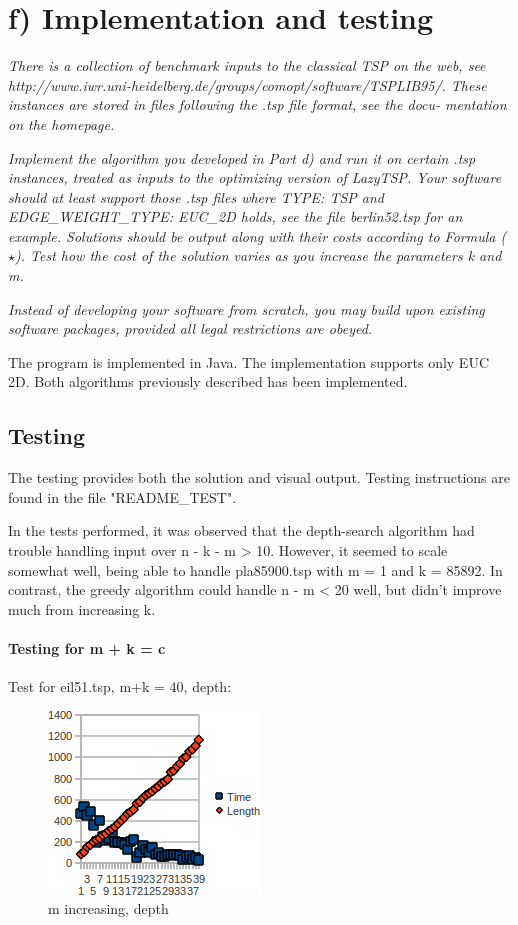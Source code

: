 
\section{f) Implementation and testing}

\textit{There is a collection of benchmark inputs to the classical TSP on the web, see
http://www.iwr.uni-heidelberg.de/groups/comopt/software/TSPLIB95/.
These instances are stored in files following the .tsp file format, see the docu-
mentation on the homepage.
}

\textit{Implement the algorithm you developed in Part d) and run it on certain .tsp
instances, treated as inputs to the optimizing version of LazyTSP. Your software
should at least support those .tsp files where TYPE: TSP and EDGE\_WEIGHT\_TYPE:
EUC\_2D holds, see the file berlin52.tsp for an example. Solutions should be
output along with their costs according to Formula (\(\star\)). Test how the cost of the
solution varies as you increase the parameters k and m.
}

\textit{Instead of developing your software from scratch, you may build upon existing
software packages, provided all legal restrictions are obeyed.
}

The program is implemented in Java. The implementation supports only EUC 2D.
Both algorithms previously described has been implemented.

\subsection{Testing}

The testing provides both the solution and visual output. Testing instructions
are found in the file "README\_TEST".

In the tests performed, it was observed that the depth-search algorithm
had trouble handling input over n - k - m > 10. However, it seemed to scale
somewhat well, being able to handle pla85900.tsp with m = 1 and k = 85892.
In contrast, the greedy algorithm could handle n - m < 20 well, but didn't improve
much from increasing k.

\paragraph{Testing for m + k = c}

Test for eil51.tsp, m+k = 40, depth:

\begin{figure}[h!]
  \caption[Eil51, depth, m+k=40]{m increasing, depth}
  \centering
    \includegraphics[scale=1.0]{image_1.png}
\end{figure}

